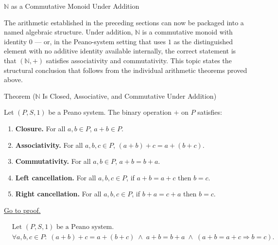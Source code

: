 \label{sec:algebraic-structure-of-n}

\begin{topicbox}{$\mathbb{N}$ as a Commutative Monoid Under Addition}
\begin{exposition}
The arithmetic established in the preceding sections can now be packaged into
a named algebraic structure. Under addition, $\mathbb{N}$ is a commutative
monoid with identity $0$ --- or, in the Peano-system setting that uses $1$
as the distinguished element with no additive identity available internally,
the correct statement is that $(\mathbb{N}, +)$ satisfies associativity and
commutativity. This topic states the structural conclusion that follows from
the individual arithmetic theorems proved above.
\end{exposition}

\begin{theorembox}{Theorem ($\mathbb{N}$ Is Closed, Associative, and Commutative Under Addition)}
\begin{theorem}
\label{thm:n-additive-structure}
Let $(P,S,1)$ be a Peano system. The binary operation $+$ on $P$ satisfies:
\begin{enumerate}
  \item \textbf{Closure.} For all $a,b \in P$, $a+b \in P$.
  \item \textbf{Associativity.} For all $a,b,c \in P$,
  $(a+b)+c = a+(b+c)$.
  \item \textbf{Commutativity.} For all $a,b \in P$, $a+b = b+a$.
  \item \textbf{Left cancellation.} For all $a,b,c \in P$, if $a+b = a+c$ then $b=c$.
  \item \textbf{Right cancellation.} For all $a,b,c \in P$, if $b+a = c+a$ then $b=c$.
\end{enumerate}
\hyperref[prf:n-additive-structure]{Go to proof.}
\end{theorem}
\end{theorembox}

\begin{remark*}
\[
\begin{aligned}
&\text{Let } (P,S,1) \text{ be a Peano system.}\\
&\forall a,b,c \in P:\;
(a+b)+c = a+(b+c)
\;\land\;
a+b = b+a
\;\land\;
(a+b=a+c \Longrightarrow b=c).
\end{aligned}
\]
\end{remark*}


\end{topicbox}
